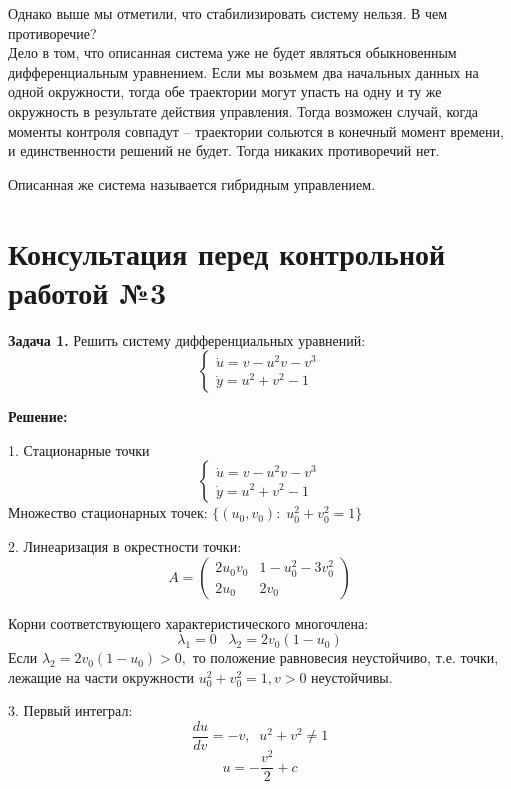 \documentclass[10pt]{report}
\begin{document}
Однако выше мы отметили, что стабилизировать систему нельзя. В чем противоречие?\\
Дело в том, что описанная система уже не будет являться обыкновенным дифференциальным уравнением. Если мы возьмем два начальных данных на одной окружности, тогда обе траектории могут упасть на одну и ту же окружность в результате действия управления. Тогда возможен случай, когда моменты контроля совпадут -- траектории сольются в конечный момент времени, и единственности решений не будет. Тогда никаких противоречий нет.

Описанная же система называется гибридным управлением. 


\chapter[{Консультация перед контрольной работой №3}]{Консультация перед контрольной работой №3}
\thispagestyle{empty}
\textbf{Задача 1.} Решить систему дифференциальных уравнений:
\begin{equation}
\left\{
\begin{array}{lr}
\dot{u}=v-u^2v-v^3\\
\dot{y}=u^2+v^2-1
\end{array}
\right.
\end{equation}

\textbf{Решение:}

1. Стационарные точки
\[\left\{
\begin{array}{lr}
\dot{u}=v-u^2v-v^3\\
\dot{y}=u^2+v^2-1
\end{array}
\right.\]
Множество стационарных точек: $\{(u_0,v_0):\; u_0^2+v_0^2=1\}$

2. Линеаризация в окрестности точки:
\[A=\left(
\begin{array}{cc}
2u_0v_0 & 1-u_0^2-3v_0^2\\
2u_0 & 2v_0
\end{array}\right)\]

Корни соответствующего характеристического многочлена:
\[\lambda_1=0 \;\;\; \lambda_2=2v_0(1-u_0)\]
Если $\lambda_2=2v_0(1-u_0)>0,$ то положение равновесия неустойчиво, т.е. точки, лежащие на части окружности  $u_0^2+v_0^2=1, v>0$ неустойчивы.

3. Первый интеграл:
\[ \frac {du}{dv}=-v,\; \; u^2+v^2\ne1\]
\[u=- \frac {v^2} 2 +c\]
\end{document}

